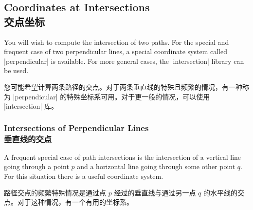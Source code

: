 
\subsection{Coordinates at Intersections\\交点坐标}
\label{section-intersection-coordinates}

You will wish to compute the intersection of two paths. For the special and
frequent case of two perpendicular lines, a special coordinate system called
|perpendicular| is available. For more general cases, the |intersection|
library can be used.

您可能希望计算两条路径的交点。对于两条垂直线的特殊且频繁的情况，有一种称为 |perpendicular| 的特殊坐标系可用。对于更一般的情况，可以使用 |intersection| 库。


\subsubsection{Intersections of Perpendicular Lines\\垂直线的交点}

A frequent special case of path intersections is the intersection of a vertical
line going through a point $p$ and a horizontal line going through some other
point $q$. For this situation there is a useful coordinate system.

路径交点的频繁特殊情况是通过点 $p$ 经过的垂直线与通过另一点 $q$ 的水平线的交点。对于这种情况，有一个有用的坐标系。


